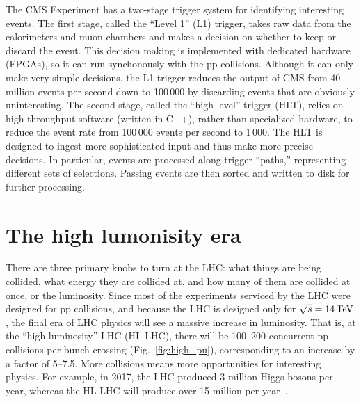The CMS Experiment has a two-stage trigger system for identifying interesting events. 
The first stage, called the ``Level 1'' (L1) trigger, takes raw data from the calorimeters and muon chambers and makes a decision on whether to keep or discard the event. 
This decision making is implemented with dedicated hardware (FPGAs), so it can run synchonously with the pp collisions. 
Although it can only make very simple decisions, the L1 trigger reduces the output of CMS from 40 million events per second down to 100\,000 by discarding events that are obviously uninteresting. 
The second stage, called the ``high level'' trigger (HLT), relies on high-throughput software (written in C++), rather than specialized hardware, to reduce the event rate from 100\,000 events per second to 1\,000. 
The HLT is designed to ingest more sophisticated input and thus make more precise decisions. 
In particular, events are processed along trigger ``paths,'' representing different sets of selections. 
Passing events are then sorted and written to disk for further processing. 

\section{The high lumonisity era}
There are three primary knobs to turn at the LHC: what things are being collided, what energy they are collided at, and how many of them are collided at once, or the luminosity. 
Since most of the experiments serviced by the LHC were designed for pp collisions, and because the LHC is designed only for $\sqrt{s} = 14\,\text{Te\hspace{-.08em}V}$, the final era of LHC physics will see a massive increase in luminosity. 
That is, at the ``high luminosity'' LHC (HL-LHC), there will be 100--200 concurrent pp collisions per bunch crossing (Fig.~\ref{fig:high_pu}), corresponding to an increase by a factor of 5--7.5.
More collisions means more opportunities for interesting physics. 
For example, in 2017, the LHC produced 3 million Higgs bosons per year, whereas the HL-LHC will produce over 15 million per year~\cite{HighLumiWebFacts}. 


